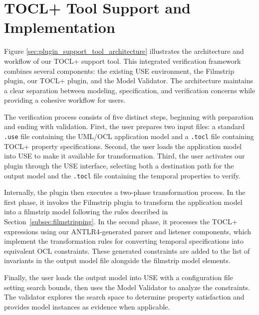 \section{TOCL+ Tool Support and Implementation}

\hspace{1cm} Figure \ref{sec:plugin_support_tool_architecture} illustrates the 
architecture and workflow of our TOCL+ support tool. This integrated verification 
framework combines several components: the existing USE environment, the Filmstrip 
plugin, our TOCL+ plugin, and the Model Validator. The architecture maintains a 
clear separation between modeling, specification, and verification concerns while 
providing a cohesive workflow for users.

The verification process consists of five distinct steps, beginning with preparation 
and ending with validation. First, the user prepares two input files: a standard 
\texttt{.use} file containing the UML/OCL application model and a \texttt{.tocl} 
file containing TOCL+ property specifications. Second, the user loads the application 
model into USE to make it available for transformation. Third, the user activates 
our plugin through the USE interface, selecting both a destination path for the 
output model and the \texttt{.tocl} file containing the temporal properties to verify.

Internally, the plugin then executes a two-phase transformation process. In the 
first phase, it invokes the Filmstrip plugin to transform the application model 
into a filmstrip model following the rules described in Section~\ref{subsec:filmstripping}. 
In the second phase, it processes the TOCL+ expressions using our ANTLR4-generated 
parser and listener components, which implement the transformation rules for 
converting temporal specifications into equivalent OCL constraints. These generated 
constraints are added to the list of invariants in the output model file alongside 
the filmstrip model elements.

Finally, the user loads the output model into USE with a configuration file setting search bounds, then uses the Model Validator to analyze the constraints. The validator explores the search space to determine property satisfaction and provides model instances as evidence when applicable.

